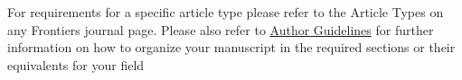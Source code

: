 \documentclass[utf8]{FrontiersinHarvard} %
\begin{document}
For requirements for a specific article type please refer to the Article Types on any Frontiers journal page. Please also refer to  \href{http://home.frontiersin.org/about/author-guidelines#Sections}{Author Guidelines} for further information on how to organize your manuscript in the required sections or their equivalents for your field








\end{document}
